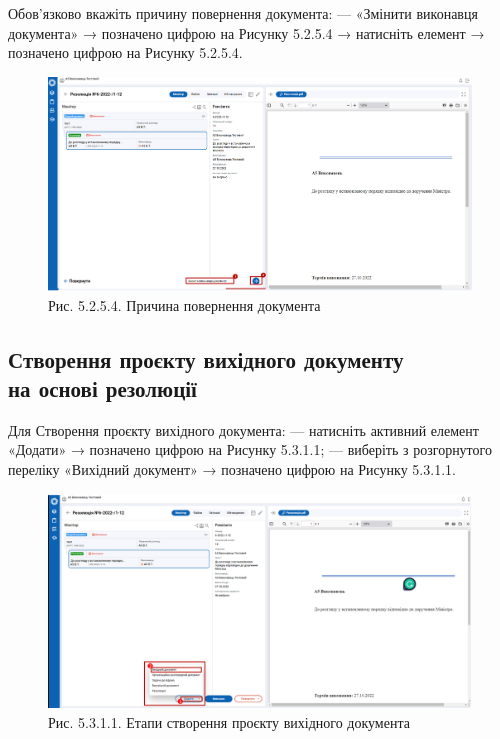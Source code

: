 Обов'язково вкажіть причину повернення документа:
--- «Змінити виконавця документа» → позначено цифрою  на Рисунку 5.2.5.4
→ натисніть елемент  → позначено цифрою  на Рисунку 5.2.5.4.

\begin{figure}[!htbp]
\centerline{\includegraphics[width=\textwidth]{img/5.2.5.4.png}}
\caption{Рис. 5.2.5.4. Причина повернення документа}
\end{figure}

\subsection{Створення проєкту вихідного документу \\ на основі резолюції}

Для Створення проєкту вихідного документа:
--- натисніть активний елемент «Додати» → позначено цифрою  на Рисунку 5.3.1.1;
---  виберіть з розгорнутого переліку «Вихідний документ» → позначено цифрою  на Рисунку 5.3.1.1.

\begin{figure}[!htbp]
\centerline{\includegraphics[width=\textwidth]{img/5.3.1.1.png}}
\caption{Рис. 5.3.1.1. Етапи створення проєкту вихідного документа}
\end{figure}

